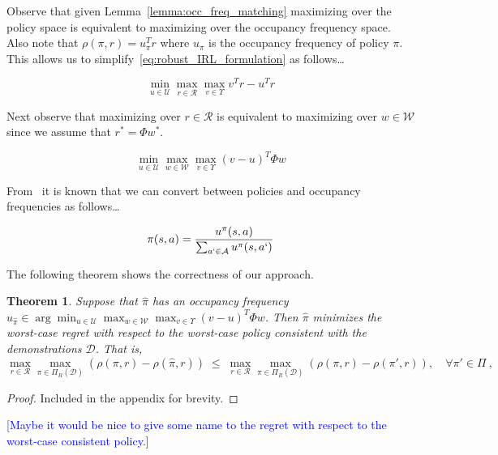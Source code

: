 \documentclass[11pt]{article}
\newtheorem{theorem}{Theorem}
\newcommand{\mm}[1]{\textcolor{blue}{[#1]}}
\begin{document}
Observe that given Lemma~\ref{lemma:occ_freq_matching} maximizing over the policy space is equivalent to maximizing over the occupancy frequency space.
Also note that $\rho(\pi,r) = u_{\pi}^T r$ where $u_{\pi}$ is the occupancy frequency of policy $\pi$. This allows us to simplify~\eqref{eq:robust_IRL_formulation} as follows\dots

\begin{equation}
	\min_{u \in \mathcal{U}} \max_{r \in \mathcal{R}} \max_{v \in \Upsilon} v^T r - u^T r
\end{equation}

Next observe that maximizing over $r \in \mathcal{R}$ is equivalent to maximizing over $w \in \mathcal{W}$ since we assume that $r^* = \Phi w^*$.

\begin{equation}\label{eq:primal-robust-irl}
	\min_{u \in \mathcal{U}} \max_{w \in \mathcal{W}} \max_{v \in \Upsilon} (v - u)^T \Phi w
\end{equation}

From~\cite{PUTERMAN} it is known that we can convert between policies and occupancy frequencies as follows\dots

\begin{equation}\label{eq:policy-construction}
	\pi(s, a) = \frac{u^{\pi}(s,a)}{\sum_{a` \in \mathcal{A}} u^{\pi}(s,a`)}
\end{equation}

The following theorem shows the correctness of our approach.

\begin{theorem}\label{thrm:chebeyshev-regret}
	Suppose that $\hat{\pi}$ has an occupancy frequency $u_{\hat{\pi}} \in \arg\min_{u \in \mathcal{U}} \max_{w \in \mathcal{W}} \max_{v \in \Upsilon} (v - u)^T \Phi w$.
	Then $\hat{\pi}$ minimizes the worst-case regret with respect to the worst-case
	policy consistent with the demonstrations $\mathcal{D}$. That is,
	\[
		\max_{r\in \mathcal{R}} \max_{\pi \in \Pi_{R}(\mathcal{D})} \left(\rho(\pi, r) - \rho(\hat{\pi}, r)\right)
		\; \le\;
		\max_{r\in \mathcal{R}} \max_{\pi \in \Pi_{R}(\mathcal{D})} \left(\rho(\pi, r) - \rho(\pi', r)\right), \quad  \forall \pi' \in \Pi~,
	\]
\end{theorem}

\begin{proof}
	Included in the appendix for brevity.
\end{proof}

\mm{Maybe it would be nice to give some name to the regret with respect to the worst-case consistent policy.}
\end{document}

